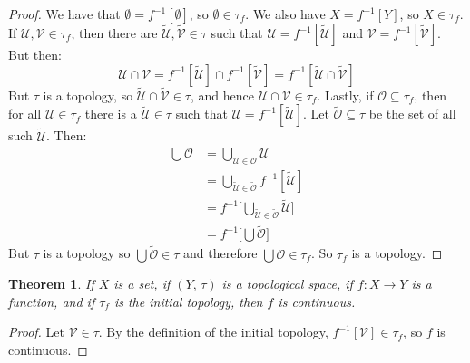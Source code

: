 \documentclass{article}
\theoremstyle{plain}
\newtheorem{theorem}{Theorem}[section]
\theoremstyle{normal}
\begin{document}
        \begin{proof}
            We have that $\emptyset=f^{-1}[\emptyset]$, so
            $\emptyset\in\tau_{f}$. We also have $X=f^{-1}[Y]$, so
            $X\in\tau_{f}$. If $\mathcal{U},\mathcal{V}\in\tau_{f}$, then
            there are $\tilde{\mathcal{U}},\tilde{\mathcal{V}}\in\tau$ such
            that $\mathcal{U}=f^{-1}[\tilde{\mathcal{U}}]$ and
            $\mathcal{V}=f^{-1}[\tilde{\mathcal{V}}]$. But then:
            \begin{equation}
                \mathcal{U}\cap\mathcal{V}
                =f^{-1}[\tilde{\mathcal{U}}]\cap{f}^{-1}[\tilde{\mathcal{V}}]
                =f^{-1}[\tilde{\mathcal{U}}\cap\tilde{\mathcal{V}}]
            \end{equation}
            But $\tau$ is a topology, so
            $\tilde{\mathcal{U}}\cap\tilde{\mathcal{V}}\in\tau$, and hence
            $\mathcal{U}\cap\mathcal{V}\in\tau_{f}$. Lastly, if
            $\mathcal{O}\subseteq\tau_{f}$, then for all
            $\mathcal{U}\in\tau_{f}$ there is a $\tilde{\mathcal{U}}\in\tau$
            such that $\mathcal{U}=f^{-1}[\tilde{\mathcal{U}}]$. Let
            $\tilde{\mathcal{O}}\subseteq\tau$ be the set of all such
            $\tilde{\mathcal{U}}$. Then:
            \begin{align}
                \bigcup\mathcal{O}
                &=\bigcup_{\mathcal{U}\in\mathcal{O}}\mathcal{U}\\
                &=\bigcup_{\tilde{\mathcal{U}}\in\tilde{\mathcal{O}}}
                    f^{-1}[\tilde{\mathcal{U}}]\\
                &=f^{-1}\Big[
                    \bigcup_{\tilde{\mathcal{U}}\in\tilde{\mathcal{O}}}
                    \tilde{\mathcal{U}}
                \Big]\\
                &=f^{-1}\Big[
                    \bigcup\tilde{\mathcal{O}}
                \Big]
            \end{align}
            But $\tau$ is a topology so $\bigcup\tilde{\mathcal{O}}\in\tau$
            and therefore $\bigcup\mathcal{O}\in\tau_{f}$. So $\tau_{f}$
            is a topology.
        \end{proof}
        \begin{theorem}
            If $X$ is a set, if $(Y,\,\tau)$ is a topological space, if
            $f:X\rightarrow{Y}$ is a function, and if $\tau_{f}$ is the initial
            topology, then $f$ is continuous.
        \end{theorem}
        \begin{proof}
            Let $\mathcal{V}\in\tau$. By the definition of the initial topology,
            $f^{-1}[\mathcal{V}]\in\tau_{f}$, so $f$ is continuous.
        \end{proof}
\end{document}

